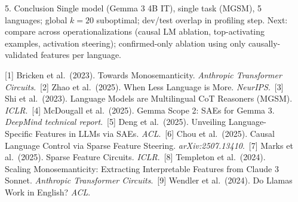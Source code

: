 \documentclass[final]{beamer}
\newlength{\sepwidth}
\newlength{\colwidth}
\newcommand{\separatorcolumn}{\begin{column}{\sepwidth}\end{column}}
\begin{document}
\begin{frame}[t]
\begin{columns}[t]
\begin{column}{\colwidth}
\begin{exampleblock}{5. Conclusion}
    {\small Single model (Gemma 3 4B IT), single task (MGSM), 5 languages;
    global $k{=}20$ suboptimal; dev/test overlap in profiling step.
    Next: compare across operationalizations (causal LM ablation,
    top-activating examples, activation steering); confirmed-only ablation
    using only causally-validated features per language.}

    {\scriptsize
    [1] Bricken et al.\ (2023). Towards Monosemanticity.
    \textit{Anthropic Transformer Circuits}.\
    [2] Zhao et al.\ (2025). When Less Language is More.
    \textit{NeurIPS}.\
    [3] Shi et al.\ (2023). Language Models are Multilingual CoT Reasoners
    (MGSM). \textit{ICLR}.\
    [4] McDougall et al.\ (2025). Gemma Scope 2: SAEs for Gemma 3.
    \textit{DeepMind technical report}.\
    [5] Deng et al.\ (2025). Unveiling Language-Specific Features in LLMs
    via SAEs. \textit{ACL}.\
    [6] Chou et al.\ (2025). Causal Language Control via Sparse Feature
    Steering. \textit{arXiv:2507.13410}.\
    [7] Marks et al.\ (2025). Sparse Feature Circuits. \textit{ICLR}.\
    [8] Templeton et al.\ (2024). Scaling Monosemanticity: Extracting
    Interpretable Features from Claude 3 Sonnet. \textit{Anthropic
    Transformer Circuits}.\
    [9] Wendler et al.\ (2024). Do Llamas Work in English?
    \textit{ACL}.
    }

  \end{exampleblock}

\end{column}

\separatorcolumn
\end{columns}
\end{frame}
\end{document}
